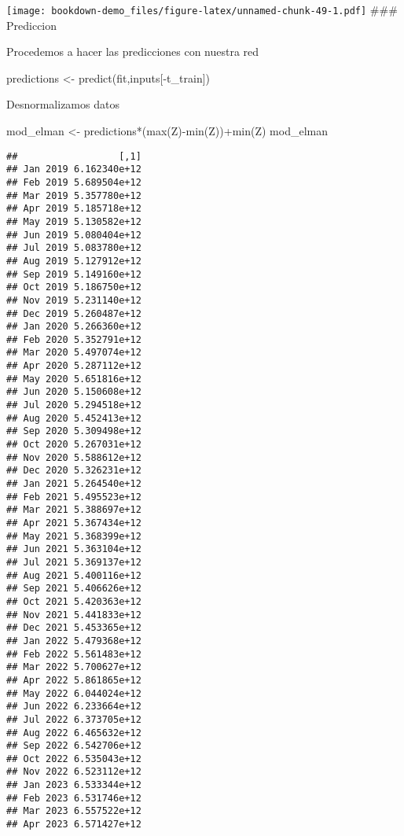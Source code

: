 \documentclass[
]{book}
\newenvironment{Shaded}{\begin{snugshade}}{\end{snugshade}}
\newcommand{\FunctionTok}[1]{\textcolor[rgb]{0.00,0.00,0.00}{#1}}
\newcommand{\NormalTok}[1]{#1}
\newcommand{\OtherTok}[1]{\textcolor[rgb]{0.56,0.35,0.01}{#1}}
\newcommand{\SpecialCharTok}[1]{\textcolor[rgb]{0.00,0.00,0.00}{#1}}
\begin{document}
\texttt{[image: bookdown-demo\_files/figure-latex/unnamed-chunk-49-1.pdf]}
\#\#\# Prediccion

Procedemos a hacer las predicciones con nuestra red

\begin{Shaded}
\begin{Highlighting}[]
\NormalTok{predictions }\OtherTok{\textless{}{-}} \FunctionTok{predict}\NormalTok{(fit,inputs[}\SpecialCharTok{{-}}\NormalTok{t\_train])}
\end{Highlighting}
\end{Shaded}

Desnormalizamos datos

\begin{Shaded}
\begin{Highlighting}[]
\NormalTok{mod\_elman }\OtherTok{\textless{}{-}}\NormalTok{ predictions}\SpecialCharTok{*}\NormalTok{(}\FunctionTok{max}\NormalTok{(Z)}\SpecialCharTok{{-}}\FunctionTok{min}\NormalTok{(Z))}\SpecialCharTok{+}\FunctionTok{min}\NormalTok{(Z)}
\NormalTok{mod\_elman}
\end{Highlighting}
\end{Shaded}

\begin{verbatim}
##                  [,1]
## Jan 2019 6.162340e+12
## Feb 2019 5.689504e+12
## Mar 2019 5.357780e+12
## Apr 2019 5.185718e+12
## May 2019 5.130582e+12
## Jun 2019 5.080404e+12
## Jul 2019 5.083780e+12
## Aug 2019 5.127912e+12
## Sep 2019 5.149160e+12
## Oct 2019 5.186750e+12
## Nov 2019 5.231140e+12
## Dec 2019 5.260487e+12
## Jan 2020 5.266360e+12
## Feb 2020 5.352791e+12
## Mar 2020 5.497074e+12
## Apr 2020 5.287112e+12
## May 2020 5.651816e+12
## Jun 2020 5.150608e+12
## Jul 2020 5.294518e+12
## Aug 2020 5.452413e+12
## Sep 2020 5.309498e+12
## Oct 2020 5.267031e+12
## Nov 2020 5.588612e+12
## Dec 2020 5.326231e+12
## Jan 2021 5.264540e+12
## Feb 2021 5.495523e+12
## Mar 2021 5.388697e+12
## Apr 2021 5.367434e+12
## May 2021 5.368399e+12
## Jun 2021 5.363104e+12
## Jul 2021 5.369137e+12
## Aug 2021 5.400116e+12
## Sep 2021 5.406626e+12
## Oct 2021 5.420363e+12
## Nov 2021 5.441833e+12
## Dec 2021 5.453365e+12
## Jan 2022 5.479368e+12
## Feb 2022 5.561483e+12
## Mar 2022 5.700627e+12
## Apr 2022 5.861865e+12
## May 2022 6.044024e+12
## Jun 2022 6.233664e+12
## Jul 2022 6.373705e+12
## Aug 2022 6.465632e+12
## Sep 2022 6.542706e+12
## Oct 2022 6.535043e+12
## Nov 2022 6.523112e+12
## Jan 2023 6.533344e+12
## Feb 2023 6.531746e+12
## Mar 2023 6.557522e+12
## Apr 2023 6.571427e+12
\end{verbatim}
\end{document}
